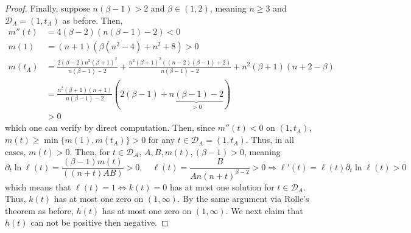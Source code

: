 \documentclass[10pt,a4paper]{amsart}
\newcommand{\p}{\partial}
\begin{document}
\begin{proof}
Finally, suppose $n(\beta-1)>2$ and $\beta \in (1,2)$, meaning $n\geq 3$ and $\mathcal{D}_A=(1,t_A)$ as before. Then,
\begin{align*}
    m''(t)&=4(\beta-2)(n(\beta-1)-2)<0\\
    m(1)&=(n+1)(\beta(n^2-4)+n^2+8)>0\\
    m(t_A)&=\frac{2(\beta-2)n^2(\beta+1)^2}{n(\beta-1)-2}+\frac{n^2(\beta+1)^2((n-2)(\beta-1)+2)}{n(\beta-1)-2}+n^2(\beta+1)(n+2-\beta)\\
    &=\frac{n^2(\beta+1)(n+1)}{n(\beta-1)-2}(2(\beta-1)+\underbrace{n(\beta-1)-2}_{>0})\\
    &>0
\end{align*}
which one can verify by direct computation.
Then, since $m''(t)<0$ on $(1,t_A)$, $m(t)\geq \min\{m(1),m(t_A)\}>0$ for any $t \in \mathcal{D}_A=(1,t_A)$. Thus, in all cases, $m(t)>0$. Then, for $t\in \mathcal{D_A}$, $A,B,m(t),(\beta-1)>0$, meaning 
$$\p_t \ln \ell(t)=\frac{(\beta-1)m(t)}{((n+t)AB)}>0,\quad \ell(t)=\frac{B}{An(n+t)^{\beta-2}}>0\Rightarrow \ell'(t)=\ell(t)\p_t\ln \ell(t)>0$$ 
which means that $\ell(t)=1\Leftrightarrow k(t)=0$ has at most one solution for $t\in \mathcal{D}_A$. Thus, $k(t)$ has at most one zero on $(1,\infty)$. By the same argument via Rolle's theorem as before, $h(t)$ has at most one zero on $(1,\infty)$. We next claim that $h(t)$ can not be positive then negative. 


\end{proof}
\end{document}
